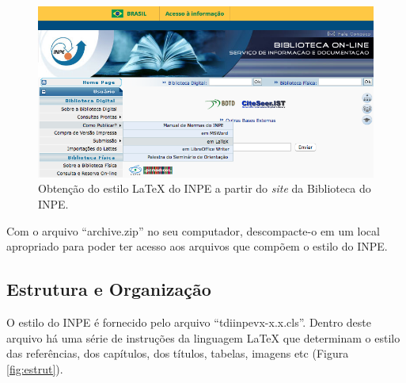 \begin{figure}[H]
    \centering
    \includegraphics[scale=0.5]{./figs/biblio_pub_latex.png}
    \caption{Obtenção do estilo LaTeX do INPE a partir do \textit{site} da Biblioteca do INPE.}
    \label{fig:biblio_pub_latex}
\end{figure}

Com o arquivo ``archive.zip'' no seu computador, descompacte-o em um local apropriado para poder ter acesso aos arquivos que compõem o estilo do INPE.


\subsection{Estrutura e Organização}
\label{sec:estrut}

O estilo do INPE é fornecido pelo arquivo ``tdiinpevx-x.x.cls''. Dentro deste arquivo há uma série de instruções da linguagem LaTeX que determinam o estilo das referências, dos capítulos, dos títulos, tabelas, imagens etc (Figura \ref{fig:estrut}).

